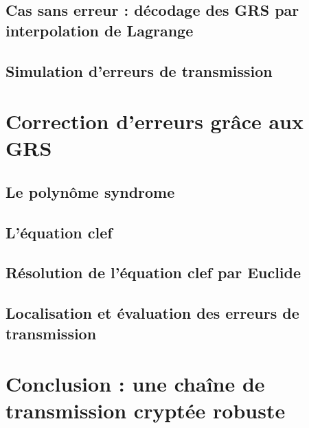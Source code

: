 \documentclass[titlepage]{article}
\begin{document}
        \subsection{Cas sans erreur : décodage des GRS par interpolation de Lagrange}
        \subsection{Simulation d’erreurs de transmission}
    \section{Correction d’erreurs grâce aux GRS}
        \subsection{Le polynôme syndrome}
        \subsection{L’équation clef}
        \subsection{Résolution de l’équation clef par Euclide}
        \subsection{Localisation et évaluation des erreurs de transmission}
    \section{Conclusion : une chaîne de transmission cryptée robuste}
\end{document}
